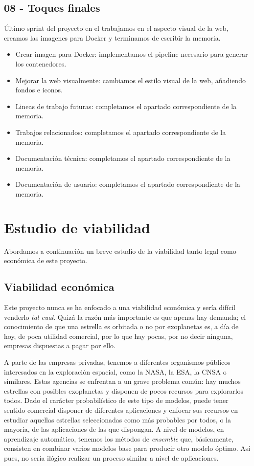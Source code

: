 \subsection{08 - Toques finales 
\newline[02/06/2020 – 26/06/2020]}

Último sprint del proyecto en el trabajamos en el aspecto visual de la web, creamos las imagenes para Docker y terminamos de escribir la memoria.

\begin{itemize}
    \item Crear imagen para Docker: implementamos el pipeline necesario para generar los contenedores.
    \item Mejorar la web visualmente: cambiamos el estilo visual de la web, añadiendo fondos e iconos.
    \item Lineas de trabajo futuras: completamos el apartado correspondiente de la memoria.
    \item Trabajos relacionados: completamos el apartado correspondiente de la memoria.
    \item Documentación técnica: completamos el apartado correspondiente de la memoria.
    \item Documentación de usuario: completamos el apartado correspondiente de la memoria.
\end{itemize}

\section{Estudio de viabilidad}

Abordamos a continuación un breve estudio de la viabilidad tanto legal como económica de este proyecto.

\subsection{Viabilidad económica}

Este proyecto nunca se ha enfocado a una viabilidad económica y sería difícil venderlo \textit{tal cual}. Quizá la razón más importante es que apenas hay demanda; el conocimiento de que una estrella es orbitada o no por exoplanetas es, a día de hoy, de poca utilidad comercial, por lo que hay pocas, por no decir ninguna, empresas dispuestas a pagar por ello.

A parte de las empresas privadas, tenemos a diferentes organismos públicos interesados en la exploración espacial, como la NASA, la ESA, la CNSA o similares. Estas agencias se enfrentan a un grave problema común: hay muchos estrellas con posibles exoplanetas y disponen de pocos recursos para explorarlos todos. Dado el carácter probabilístico de este tipo de modelos, puede tener sentido comercial disponer de diferentes aplicaciones y enfocar sus recursos en estudiar aquellas estrellas seleccionadas como más probables por todos, o la mayoría, de las aplicaciones de las que dispongan. A nivel de modelos, en aprendizaje automático, tenemos los métodos de \textit{ensemble} que, básicamente, consisten en combinar varios modelos base para producir otro modelo óptimo. Así pues, no sería ilógico realizar un proceso similar a nivel de aplicaciones.

